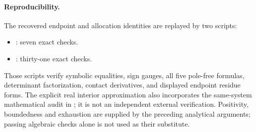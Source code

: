 \paragraph{Reproducibility.}
The recovered endpoint and allocation identities are replayed by
two scripts:
\begin{itemize}
\item {}: seven exact checks.
\item {}: thirty-one exact checks.
\end{itemize}
Those scripts verify symbolic equalities, sign gauges, all five
pole-free formulas, determinant factorization, contact derivatives,
and displayed endpoint residue forms. The explicit real interior
approximation also incorporates the same-system mathematical audit
in ; it is not an independent
external verification. Positivity, boundedness and
exhaustion are supplied by the preceding analytical arguments;
passing algebraic checks alone is not used as their substitute.
